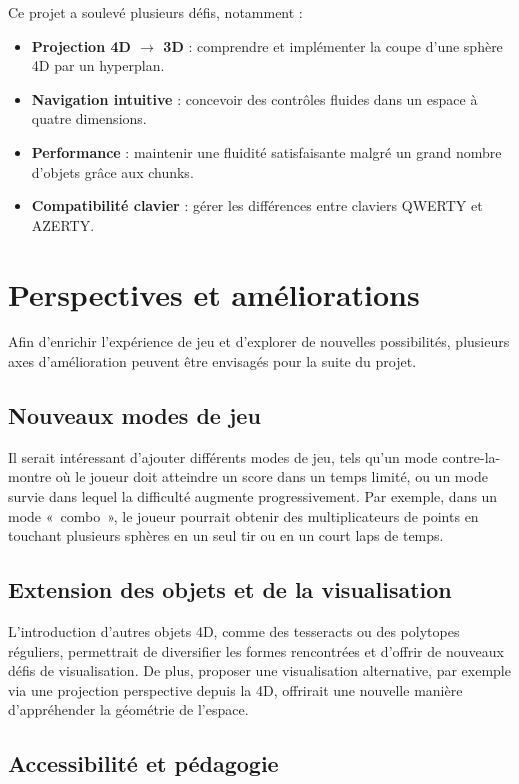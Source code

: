 \documentclass[11pt,a4paper]{article}
\begin{document}
Ce projet a soulevé plusieurs défis, notamment :
\begin{itemize}
	\item \textbf{Projection 4D $\rightarrow$ 3D} : comprendre et implémenter la coupe d’une sphère 4D par un hyperplan.
	\item \textbf{Navigation intuitive} : concevoir des contrôles fluides dans un espace à quatre dimensions.
	\item \textbf{Performance} : maintenir une fluidité satisfaisante malgré un grand nombre d’objets grâce aux chunks.
	\item \textbf{Compatibilité clavier} : gérer les différences entre claviers QWERTY et AZERTY.
\end{itemize}

\section{Perspectives et améliorations}

Afin d’enrichir l’expérience de jeu et d’explorer de nouvelles possibilités, plusieurs axes d’amélioration peuvent être envisagés pour la suite du projet.

\subsection{Nouveaux modes de jeu}

Il serait intéressant d’ajouter différents modes de jeu, tels qu’un mode contre-la-montre où le joueur doit atteindre un score dans un temps limité, ou un mode survie dans lequel la difficulté augmente progressivement. Par exemple, dans un mode « combo », le joueur pourrait obtenir des multiplicateurs de points en touchant plusieurs sphères en un seul tir ou en un court laps de temps.

\subsection{Extension des objets et de la visualisation}

L’introduction d’autres objets 4D, comme des tesseracts ou des polytopes réguliers, permettrait de diversifier les formes rencontrées et d’offrir de nouveaux défis de visualisation. De plus, proposer une visualisation alternative, par exemple via une projection perspective depuis la 4D, offrirait une nouvelle manière d’appréhender la géométrie de l’espace.

\subsection{Accessibilité et pédagogie}
\end{document}
